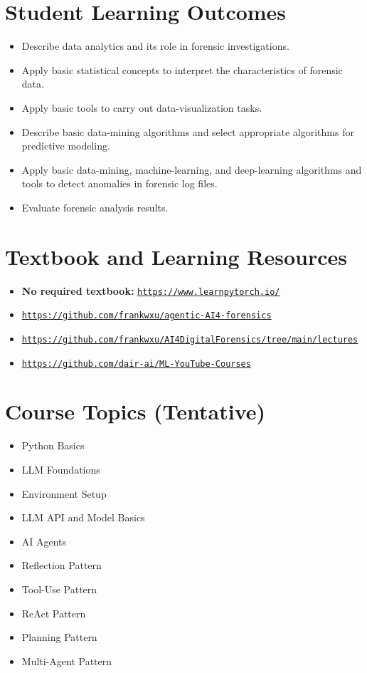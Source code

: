 \documentclass[10pt]{article}
\begin{document}
\section{Student Learning Outcomes}
\begin{itemize}
  \item Describe data analytics and its role in forensic investigations.
  \item Apply basic statistical concepts to interpret the characteristics of forensic data.
  \item Apply basic tools to carry out data-visualization tasks.
  \item Describe basic data-mining algorithms and select appropriate algorithms for predictive modeling.
  \item Apply basic data-mining, machine-learning, and deep-learning algorithms and tools to detect anomalies in forensic log files.
  \item Evaluate forensic analysis results.
\end{itemize}

\section{Textbook and Learning Resources}
\begin{itemize}
  \item \textbf{No required textbook:} \href{https://www.learnpytorch.io/}{\nolinkurl{https://www.learnpytorch.io/}}
  \item \href{https://github.com/frankwxu/agentic-AI4-forensics}{\nolinkurl{https://github.com/frankwxu/agentic-AI4-forensics}}
  \item \href{https://github.com/frankwxu/AI4DigitalForensics/tree/main/lectures}{\nolinkurl{https://github.com/frankwxu/AI4DigitalForensics/tree/main/lectures}}
  \item \href{https://github.com/dair-ai/ML-YouTube-Courses}{\nolinkurl{https://github.com/dair-ai/ML-YouTube-Courses}}
\end{itemize}

\section{Course Topics (Tentative)}
\begin{itemize}
  \item Python Basics
  \item LLM Foundations
  \item Environment Setup
  \item LLM API and Model Basics
  \item AI Agents
  \item Reflection Pattern
  \item Tool-Use Pattern
  \item ReAct Pattern
  \item Planning Pattern
  \item Multi-Agent Pattern
\end{itemize}
\end{document}
